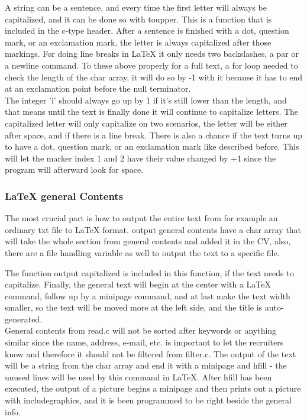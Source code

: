A string can be a sentence, and every time the first letter will always be capitalized,
and it can be done so with toupper.
This is a function that is included in the c-type header.
After a sentence is finished with a dot, question mark, or an exclamation mark, 
the letter is always capitalized after those markings.
For doing line breaks in LaTeX it only needs two backslashes, a par or a newline command. 
To these above properly for a full text, a for loop needed to check the length of the char array,
it will do so by -1 with it because it has to end at an exclamation point before the null terminator.\\

The integer 'i' should always go up by 1 if it's still lower than the length, 
and that means until the text is finally done it will continue to capitalize letters. The capitalized letter will only capitalize on two scenarios, 
the letter will be either after space, and if there is a line break.
There is also a chance if the text turns up to have a dot, question mark, or an exclamation mark like described before.
This will let the marker index 1 and 2 have their value changed by +1 since the program will afterward look for space.\\

\subsubsection{LaTeX general Contents}
The most crucial part is how to output the entire text from for example an ordinary txt file to LaTeX format.
output general contents have a char array that will take the whole section from general contents and added it in the CV,
also, there are a file handling variable as well to output the text to a specific file. 

The function output capitalized is included in this function, if the text needs to capitalize.
Finally, the general text will begin at the center with a LaTeX command, follow up by a minipage command, 
and at last make the text width smaller, so the text will be moved more at the left side, and the title is auto-generated. \\

General contents from read.c will not be sorted after keywords or anything similar since the name, address, e-mail, etc. is important to let the recruiters know and therefore it should not be filtered from filter.c.
The output of the text will be a string from the char array 
and end it with a minipage and hfill - the unused lines will be used by this command in LaTeX.
After hfill has been executed, the output of a picture begins a minipage 
and then prints out a picture with includegraphics, and it is been programmed to be right beside the general info. 

